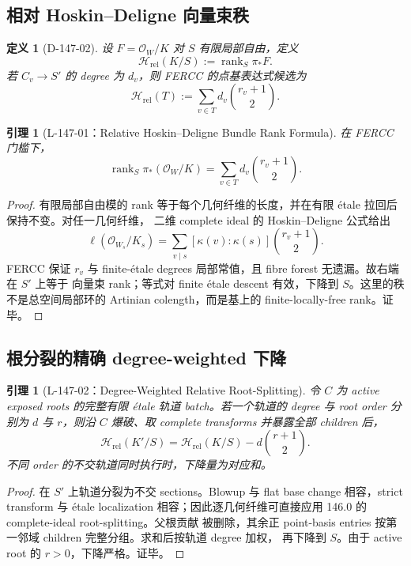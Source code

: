 \documentclass[11pt,a4paper,fontset=fandol]{ctexart}
\newtheorem{lemma}[theorem]{引理}
\newtheorem{definition}[theorem]{定义}
\newcommand{\Hrel}{\mathscr H_{\mathrm{rel}}}
\newcommand{\cO}{\mathcal O}
\begin{document}
\subsection{相对 Hoskin--Deligne 向量束秩}
\begin{definition}[D-147-02]
设 $F=\cO_W/K$ 对 $S$ 有限局部自由，定义
\[
\Hrel(K/S):=\operatorname{rank}_S\pi_*F.
\]
若 $C_v\to S'$ 的 degree 为 $d_v$，则 FERCC 的点基表达式候选为
\[
\Hrel(T):=\sum_{v\in T}d_v\binom{r_v+1}{2}.
\]
\end{definition}

\begin{lemma}[L-147-01：Relative Hoskin--Deligne Bundle Rank Formula]
在 FERCC 门槛下，
\[
\boxed{
\operatorname{rank}_S\pi_*(\cO_W/K)
=
\sum_{v\in T}d_v\binom{r_v+1}{2}.}
\]
\end{lemma}
\begin{proof}
有限局部自由模的 rank 等于每个几何纤维的长度，并在有限 étale 拉回后保持不变。对任一几何纤维，
二维 complete ideal 的 Hoskin--Deligne 公式给出
\[
\ell(\cO_{W_s}/K_s)=
\sum_{v\mid s}[\kappa(v):\kappa(s)]\binom{r_v+1}{2}.
\]
FERCC 保证 $r_v$ 与 finite-étale degrees 局部常值，且 fibre forest 无遗漏。故右端在 $S'$ 上等于
向量束 rank；等式对 finite étale descent 有效，下降到 $S$。这里的秩不是总空间局部环的
Artinian colength，而是基上的 finite-locally-free rank。证毕。
\end{proof}

\subsection{根分裂的精确 degree-weighted 下降}
\begin{lemma}[L-147-02：Degree-Weighted Relative Root-Splitting]
令 $C$ 为 active exposed roots 的完整有限 étale 轨道 batch。若一个轨道的 degree 与 root order
分别为 $d$ 与 $r$，则沿 $C$ 爆破、取 complete transforms 并暴露全部 children 后，
\[
\boxed{
\Hrel(K'/S)=\Hrel(K/S)-d\binom{r+1}{2}.}
\]
不同 order 的不交轨道同时执行时，下降量为对应和。
\end{lemma}
\begin{proof}
在 $S'$ 上轨道分裂为不交 sections。Blowup 与 flat base change 相容，strict transform 与 étale
localization 相容；因此逐几何纤维可直接应用 146.0 的 complete-ideal root-splitting。父根贡献
被删除，其余正 point-basis entries 按第一邻域 children 完整分组。求和后按轨道 degree 加权，
再下降到 $S$。由于 active root 的 $r>0$，下降严格。证毕。
\end{proof}
\end{document}
